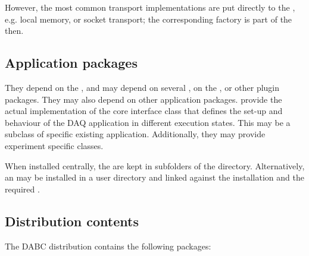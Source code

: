    However, the most common transport implementations are put 
   directly to the , e.g. local memory, or 
   socket transport; the corresponding factory is part of the  then. 
 
\subsection{Application packages}
They depend on the , and may depend 
on several , on the , or other plugin packages. 
They may also depend on other application packages. 
 provide the actual implementation of the core interface class
 that defines the set-up and behaviour of the DAQ application in 
different execution states. This may be a subclass of specific existing 
application. 
Additionally, they may provide experiment specific  classes.

When installed centrally, the  are kept in subfolders of the 
 directory. Alternatively, an  may be installed in a user directory and linked against the  installation and the required .


     
\subsection{Distribution contents}
The DABC distribution contains the following packages:


